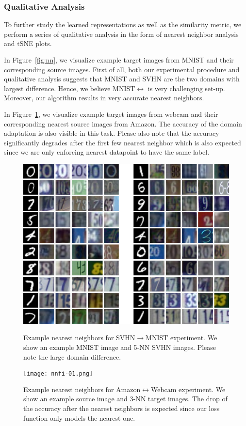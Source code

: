 \subsubsection{Qualitative Analysis}
To further study the learned representations as well as the similarity metric, we perform a series of qualitative analysis in the form of nearest neighbor analysis and tSNE\cite{tsne} plots.

In Figure~\ref{fig:nn}, we visualize example target images from MNIST and their corresponding source images. First of all, both our experimental procedure and qualitative analysis suggests that MNIST and SVHN are the two domains with largest difference. Hence, we believe MNIST$\leftrightarrow$ is very challenging set-up. Moreover, our algorithm results in very accurate nearest neighbors.

In Figure~\ref{fig:nnoffice},  we visualize example target images from webcam and their corresponding nearest source images from Amazon. The accuracy of the domain adaptation is also visible in this task. Please also note that the accuracy significantly degrades after the first few nearest neighbor which is also expected since we are only enforcing nearest datapoint to have the same label.

\begin{figure}[ht]
\begin{small}
\includegraphics[width=\columnwidth]{digit_nn.png}
\vspace{-5mm}
\caption{Example nearest neighbors for SVHN$\rightarrow$MNIST experiment. We show an example MNIST image and 5-NN SVHN images. Please note the large domain difference.}
\label{fig:nn}
\texttt{[image: nnfi-01.png]}
\caption{Example nearest neighbors for Amazon$\leftrightarrow$Webcam experiment. We show an example source image and 3-NN target images. The drop of the accuracy after the nearest neighbors is expected since our loss function only models the nearest one.}
\label{fig:nnoffice}
\end{small}
\end{figure}

